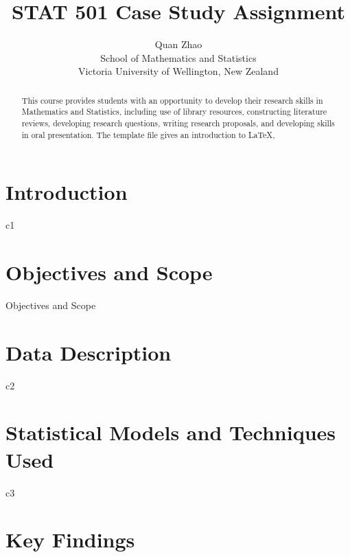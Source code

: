\documentclass[12pt]{article}
\title{STAT 501 Case Study Assignment}
\author{Quan Zhao\\
School of Mathematics and Statistics\\ Victoria University of Wellington, New Zealand}
\begin{document}
\maketitle

\begin{abstract}
  This course provides students with an opportunity to develop their
  research skills in Mathematics and Statistics, including use of
  library resources, constructing literature reviews, developing
  research questions, writing research proposals, and developing
  skills in oral presentation. The template file gives an introduction
  to LaTeX,
\end{abstract}


\tableofcontents


\setlength{\baselineskip}{0.25in} %





\newpage  %
\section{Introduction}

\label{s.intro}

c1

\section{Objectives and Scope}

\label{s.object}
Objectives and Scope

\section{Data Description}

\label{s.data}

c2

\section{Statistical Models and Techniques Used}

\label{s.modeltech}

c3

\section{Key Findings}
\end{document}
